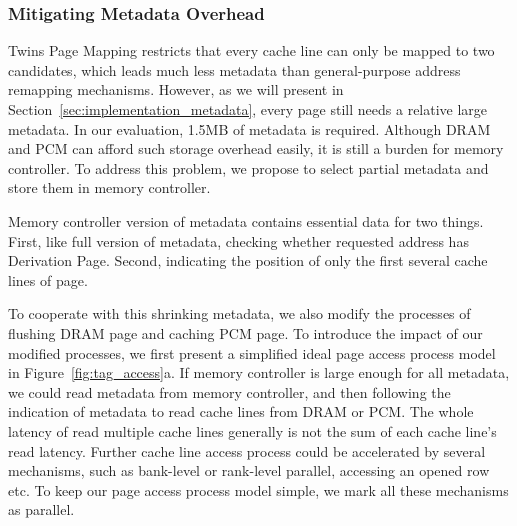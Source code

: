 \documentclass[conference]{IEEEtran}
\begin{document}
%

\subsubsection{Mitigating Metadata Overhead}\label{sec:design_mitigating_metadata}

Twins Page Mapping restricts that every cache line can only be mapped to two candidates, which leads much less metadata than general-purpose address remapping mechanisms.
However, as we will present in Section~\ref{sec:implementation_metadata}, every page still needs a relative large metadata.
In our evaluation, 1.5MB of metadata is required.
Although DRAM and PCM can afford such storage overhead easily, it is still a burden for memory controller.
To address this problem, we propose to select partial metadata and store them in memory controller.

Memory controller version of metadata contains essential data for two things.
First, like full version of metadata, checking whether requested address has Derivation Page.
Second, indicating the position of only the first several cache lines of page.

To cooperate with this shrinking metadata, we also modify the processes of flushing DRAM page and caching PCM page.
To introduce the impact of our modified processes, we first present a simplified ideal page access process model in Figure~\ref{fig:tag_access}a.
If memory controller is large enough for all metadata, we could read metadata from memory controller, and then following the indication of metadata to read cache lines from DRAM or PCM\@.
The whole latency of read multiple cache lines generally is not the sum of each cache line's read latency.
Further cache line access process could be accelerated by several mechanisms, such as bank-level or rank-level parallel, accessing an opened row etc.
To keep our page access process model simple, we mark all these mechanisms as parallel.
\end{document}
